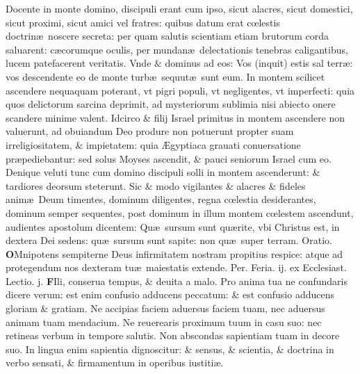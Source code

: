 \documentclass[a5paper,10pt]{book}
\def\leftmarginnote{%
	\lrmarginnote{\hskip -\marginparsep \hskip -6.5em}}
\def\ae{æ}
\def\AE{Æ}
\def\oe{œ}
\begin{document}
\begin{multicols*}{2}
\newline \color{red} D\color{black}ocente in monte domino, discipuli erant cum ipso, sicut alacres, sicut domestici, sicut proximi, sicut amici vel fratres: quibus datum erat c\oe lestis doctrin\ae \ noscere secreta: per quam salutis scientiam etiam brutorum corda saluarent: c\ae corumque oculis, per mundan\ae \ delectationis tenebras caligantibus, lucem patefacerent veritatis.
Vnde \& dominus ad eos: Vos (inquit) estis sal terr\ae : vos descendente eo de monte turb\ae \ sequut\ae \ sunt eum.
In montem scilicet ascendere nequaquam poterant, vt pigri populi, vt negligentes, vt imperfecti: quia quos delictorum sarcina deprimit, ad mysteriorum sublimia nisi abiecto onere scandere minime valent.
Idcirco \& filij Israel primitus in montem ascendere non valuerunt,
ad obuiandum Deo produre non potuerunt propter suam irreligiositatem, \& impietatem: quia \AE gyptiaca grauati conuersatione pr\ae pediebantur: sed solus Moyses ascendit, \& pauci seniorum Israel cum eo.
Denique veluti tunc cum domino discipuli solli in montem ascenderunt: \& tardiores deorsum steterunt.
Sic \& modo vigilantes \& alacres \& fideles anim\ae \ Deum timentes, dominum diligentes, regna c\oe lestia desiderantes, dominum semper sequentes, post dominum in illum montem c\oe lestem ascendunt, audientes apostolum dicentem: Qu\ae \ sursum sunt qu\ae rite, vbi Christus est, in dextera Dei sedens: qu\ae \ sursum sunt sapite: non qu\ae \ super terram. \color{red} Oratio. \color{black}
\vspace{-1.25em}
\lettrine[lines=2]{\bfseries \color{red} O}{}Mnipotens sempiterne Deus infirmitatem nostram propitius respice: atque ad protegendum nos dexteram tu\ae \ maiestatis extende. Per.
\newline {} \color{red} \hypertarget{MON-SECVNDA-VAGAN}{Feria. ij.} ex Ecclesiast. Lectio. j. \color{black}
\vspace{-.25em}
\lettrine[lines=2]{\bfseries F}{}Ili, conserua\leftmarginnote{\begin{flushright}ca. 4.\end{flushright}} tempus, \& deuita a malo.
Pro anima tua ne confundaris dicere verum: est enim confusio adducens peccatum: \& est confusio adducens gloriam \& gratiam.
Ne accipias faciem aduersus faciem tuam, nec aduersus animam tuam mendacium. Ne reuerearis proximum tuum in casu suo: nec retineas verbum in tempore salutis.
Non abscondas sapientiam tuam in decore suo. In lingua enim sapientia dignoscitur: \& sensus, \& scientia, \& doctrina in verbo sensati, \& firmamentum in operibus iustiti\ae .

\end{multicols*}
\end{document}

